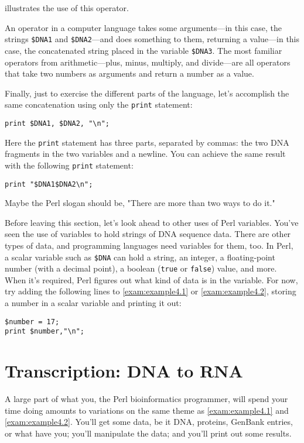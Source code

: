 illustrates the use of this operator.

\begin{adjustwidth}{2cm}{2cm}
  An operator in a computer language takes some arguments—in this case, the strings \verb|$DNA1| and \verb|$DNA2|—and does something to them, returning a value—in this case, the concatenated string placed in the variable \verb|$DNA3|. The most familiar operators from arithmetic—plus, minus, multiply, and divide—are all operators that take two numbers as arguments and return a number as a value. 
\end{adjustwidth}

Finally, just to exercise the different parts of the language, let's accomplish the same concatenation using only the \verb|print| statement:

\begin{lstlisting}
print $DNA1, $DNA2, "\n";
\end{lstlisting}

Here the \verb|print| statement has three parts, separated by commas: the two DNA fragments in the two variables and a newline. You can achieve the same result with the following \verb|print| statement:

\begin{lstlisting}
print "$DNA1$DNA2\n";
\end{lstlisting}

Maybe the Perl slogan should be, "There are more than two ways to do it."

Before leaving this section, let's look ahead to other uses of Perl variables. You've seen the use of variables to hold strings of DNA sequence data. There are other types of data, and programming languages need variables for them, too. In Perl, a scalar variable such as \verb|$DNA| can hold a string, an integer, a floating-point number (with a decimal point), a boolean (\verb|true| or \verb|false|) value, and more. When it's required, Perl figures out what kind of data is in the variable. For now, try adding the following lines to \autoref{exam:example4.1} or \autoref{exam:example4.2}, storing a number in a scalar variable and printing it out:


\begin{lstlisting}
$number = 17;
print $number,"\n";
\end{lstlisting}

\section{Transcription: DNA to RNA}
A large part of what you, the Perl bioinformatics programmer, will spend your time doing amounts to variations on the same theme as \autoref{exam:example4.1} and \autoref{exam:example4.2}. You'll get some data, be it DNA, proteins, GenBank entries, or what have you; you'll manipulate the data; and you'll print out some results.

